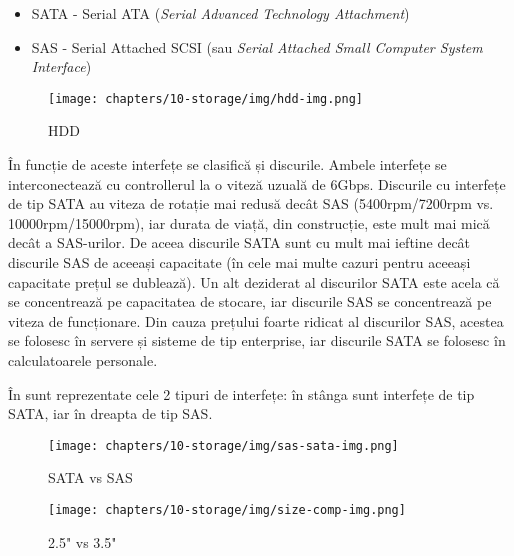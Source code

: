 \begin{itemize}
	\item SATA - Serial ATA  (\textit{Serial Advanced Technology Attachment})
	\item SAS - Serial Attached SCSI  (sau
          \textit{Serial Attached Small Computer System Interface})
\end{itemize}

\begin{figure}[!htbp]
	\centering
	\texttt{[image: chapters/10-storage/img/hdd-img.png]}
	\caption{HDD\protect\footnotemark}
	\label{fig:storage:hdd}
\end{figure}


În funcție de aceste interfețe se clasifică și discurile. Ambele interfețe se
interconectează cu controllerul la o viteză uzuală de 6Gbps. Discurile cu
interfețe de tip SATA au viteza de rotație mai redusă decât SAS (5400rpm/7200rpm
vs. 10000rpm/15000rpm), iar durata de viață, din construcție, este mult mai mică
decât a SAS-urilor. De aceea discurile SATA sunt cu mult mai ieftine decât
discurile SAS de aceeași capacitate (în cele mai multe cazuri pentru aceeași
capacitate prețul se dublează). Un alt deziderat al discurilor SATA este acela
că se concentrează pe capacitatea de stocare, iar discurile SAS se concentrează
pe viteza de funcționare. Din cauza prețului foarte ridicat al discurilor SAS,
acestea se folosesc în servere și sisteme de tip enterprise, iar discurile SATA
se folosesc în calculatoarele personale.

În  sunt reprezentate cele 2 tipuri
de interfețe: în stânga sunt interfețe de tip SATA, iar în dreapta de tip SAS.

\begin{figure}[!htbp]
	\centering
	\texttt{[image: chapters/10-storage/img/sas-sata-img.png]}
	\caption{SATA vs SAS\protect\footnotemark}
	\label{fig:storage:sas-sata}
\end{figure}


\begin{figure}[!htbp]
	\centering
	\texttt{[image: chapters/10-storage/img/size-comp-img.png]}
	\caption{2.5" vs 3.5"\protect\footnotemark}
	\label{fig:storage:size-comp}
\end{figure}

